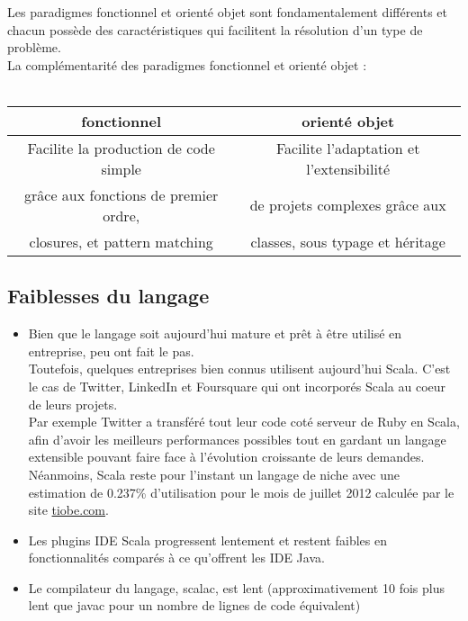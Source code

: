 Les paradigmes fonctionnel et orienté objet sont fondamentalement différents
et chacun possède des caractéristiques qui facilitent la résolution d'un type
de problème.\\
La complémentarité des paradigmes fonctionnel et orienté objet :\\\\
\begin{tabular}{|c|c|}
  \hline
  \textbf{fonctionnel} & \textbf{orienté objet}\\
  \hline
  Facilite la production de code simple & Facilite l'adaptation et l'extensibilité\\
  grâce aux fonctions de premier ordre, & de projets complexes grâce aux\\
  closures, et pattern matching & classes, sous typage et héritage \\
  \hline
\end{tabular}


\subsection{Faiblesses du langage}
\begin{itemize}
\item[\textbullet] Bien que le langage soit aujourd'hui mature et prêt à être utilisé en
  entreprise, peu ont fait le pas.\\
  Toutefois, quelques entreprises bien connus utilisent aujourd'hui Scala.
  C'est le cas de Twitter, LinkedIn et Foursquare qui ont incorporés Scala au
  coeur de leurs projets.\\
  Par exemple Twitter a transféré tout leur code coté serveur de Ruby en Scala,
  afin d'avoir les meilleurs performances possibles tout en gardant un langage
  extensible pouvant faire face à l'évolution croissante de leurs demandes.\\


  Néanmoins, Scala reste pour l'instant un langage de niche avec une estimation
  de 0.237\% d'utilisation pour le mois de juillet 2012 calculée par le site
  \href{http://www.tiobe.com/index.php/content/paperinfo/tpci/index.html}{tiobe.com}.\\
\item[\textbullet] Les plugins IDE Scala progressent lentement et restent
  faibles en fonctionnalités comparés à ce qu'offrent les IDE Java.\\
\item[\textbullet] Le compilateur du langage, scalac, est lent
  (approximativement 10 fois plus lent que javac pour un nombre de lignes de
  code équivalent)\\
\end{itemize}

